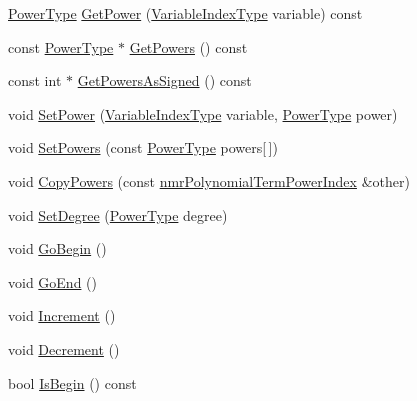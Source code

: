 \begin{DoxyCompactItemize}
\item 
\hyperlink{classnmr_polynomial_term_power_index_a2eec01c3a2c3f56f47982ceffd8e36ed}{Power\-Type} \hyperlink{classnmr_polynomial_term_power_index_ab551abf59fae5d46713430225fa5fa1c}{Get\-Power} (\hyperlink{classnmr_polynomial_term_power_index_ac982d5f82c3a95968e92d54c92cbc3e0}{Variable\-Index\-Type} variable) const 
\item 
const \hyperlink{classnmr_polynomial_term_power_index_a2eec01c3a2c3f56f47982ceffd8e36ed}{Power\-Type} $\ast$ \hyperlink{classnmr_polynomial_term_power_index_aff45ac28cb382e285968f4c478627e89}{Get\-Powers} () const 
\item 
const int $\ast$ \hyperlink{classnmr_polynomial_term_power_index_a252fcc296daeacda9430437c54b87f82}{Get\-Powers\-As\-Signed} () const 
\item 
void \hyperlink{classnmr_polynomial_term_power_index_aab9b0abdffba39e0f140755e0c3aee4f}{Set\-Power} (\hyperlink{classnmr_polynomial_term_power_index_ac982d5f82c3a95968e92d54c92cbc3e0}{Variable\-Index\-Type} variable, \hyperlink{classnmr_polynomial_term_power_index_a2eec01c3a2c3f56f47982ceffd8e36ed}{Power\-Type} power)
\item 
void \hyperlink{classnmr_polynomial_term_power_index_ab18ca045931640884b78d4fa5bddeaca}{Set\-Powers} (const \hyperlink{classnmr_polynomial_term_power_index_a2eec01c3a2c3f56f47982ceffd8e36ed}{Power\-Type} powers\mbox{[}$\,$\mbox{]})
\item 
void \hyperlink{classnmr_polynomial_term_power_index_abe622c25cb62d06d99727a78bf085f7a}{Copy\-Powers} (const \hyperlink{classnmr_polynomial_term_power_index}{nmr\-Polynomial\-Term\-Power\-Index} \&other)
\item 
void \hyperlink{classnmr_polynomial_term_power_index_ae2a29b1eecbedc0ae21af60aff06f7b2}{Set\-Degree} (\hyperlink{classnmr_polynomial_term_power_index_a2eec01c3a2c3f56f47982ceffd8e36ed}{Power\-Type} degree)
\item 
void \hyperlink{classnmr_polynomial_term_power_index_a6644ffd886be51df4361fc1362f93b7e}{Go\-Begin} ()
\item 
void \hyperlink{classnmr_polynomial_term_power_index_a5ad06505e6e054c055912ae8f08dadb3}{Go\-End} ()
\item 
void \hyperlink{classnmr_polynomial_term_power_index_a30575b4e4da50952d9ec9159fe6c4d86}{Increment} ()
\item 
void \hyperlink{classnmr_polynomial_term_power_index_a5a690b17245bc85b3dafa91575240110}{Decrement} ()
\item 
bool \hyperlink{classnmr_polynomial_term_power_index_a898e4b569333933b7240d0b0208d4e0c}{Is\-Begin} () const 

\end{DoxyCompactItemize}
